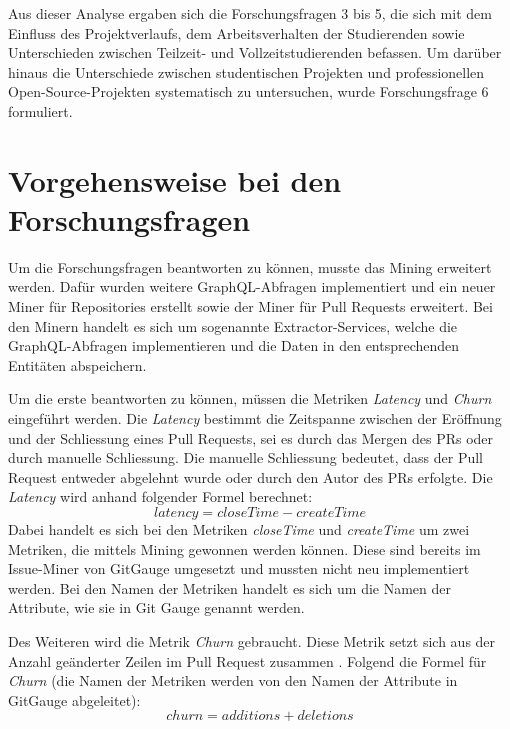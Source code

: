 Aus dieser Analyse ergaben sich die Forschungsfragen 3 bis 5, die sich mit dem Einfluss des Projektverlaufs, dem Arbeitsverhalten der Studierenden sowie Unterschieden zwischen Teilzeit- und Vollzeitstudierenden befassen. Um darüber hinaus die Unterschiede zwischen studentischen Projekten und professionellen Open-Source-Projekten systematisch zu untersuchen, wurde Forschungsfrage 6 formuliert.

\section{Vorgehensweise bei den Forschungsfragen}
\label{sec:AnalyseChurnvsLatency}
\label{sec:Metriken}
Um die Forschungsfragen beantworten zu können, musste das Mining erweitert werden. Dafür wurden weitere GraphQL-Abfragen implementiert und ein neuer  Miner für Repositories erstellt sowie der Miner für Pull Requests erweitert. Bei den Minern handelt es sich um sogenannte Extractor-Services, welche die GraphQL-Abfragen implementieren und die Daten in den entsprechenden Entitäten abspeichern.

Um die erste  beantworten zu können, müssen die Metriken \textit{Latency} und \textit{Churn} eingeführt werden. Die \textit{Latency} bestimmt die Zeitspanne zwischen der Eröffnung und der Schliessung eines Pull Requests, sei es durch das Mergen des PRs oder durch manuelle Schliessung. Die manuelle Schliessung bedeutet, dass der Pull Request entweder abgelehnt wurde oder durch den Autor des PRs erfolgte. Die \textit{Latency} wird anhand folgender Formel berechnet:
\begin{equation}
latency = closeTime - createTime
\end{equation}
Dabei handelt es sich bei den Metriken \textit{closeTime} und \textit{createTime} um zwei Metriken, die mittels Mining gewonnen werden können. Diese sind bereits im Issue-Miner von GitGauge umgesetzt und mussten nicht neu implementiert werden. Bei den Namen der Metriken handelt es sich um die Namen der Attribute, wie sie in Git Gauge genannt werden.

Des Weiteren wird die Metrik \textit{Churn} gebraucht. Diese Metrik setzt sich aus der Anzahl geänderter Zeilen im Pull Request zusammen \parencite{gousios_exploratory_2014}. Folgend die Formel für \textit{Churn} (die Namen der Metriken werden von den Namen der Attribute in GitGauge abgeleitet): 
\begin{equation}
churn = additions + deletions
\end{equation}

